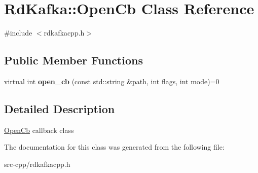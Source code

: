 \hypertarget{classRdKafka_1_1OpenCb}{\section{Rd\-Kafka\-:\-:Open\-Cb Class Reference}
\label{classRdKafka_1_1OpenCb}
}


{\ttfamily \#include $<$rdkafkacpp.\-h$>$}

\subsection*{Public Member Functions}
\begin{DoxyCompactItemize}
\item 
\hypertarget{classRdKafka_1_1OpenCb_a85d9605e2551aa43eca61f218ad47d54}{virtual int {\bfseries open\-\_\-cb} (const std\-::string \&path, int flags, int mode)=0}\label{classRdKafka_1_1OpenCb_a85d9605e2551aa43eca61f218ad47d54}

\end{DoxyCompactItemize}


\subsection{Detailed Description}
\hyperlink{classRdKafka_1_1OpenCb}{Open\-Cb} callback class 

The documentation for this class was generated from the following file\-:\begin{DoxyCompactItemize}
\item 
src-\/cpp/rdkafkacpp.\-h\end{DoxyCompactItemize}
